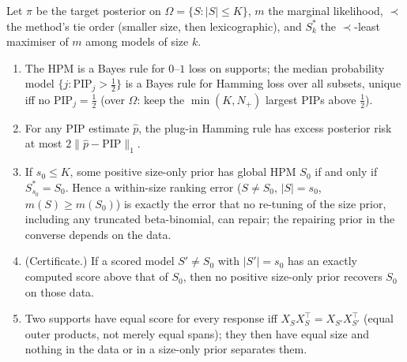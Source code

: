 \begin{proposition}\label{prop:decision}
Let $\pi$ be the target posterior on $\Omega=\{S:|S|\le K\}$, $m$ the marginal likelihood, $\prec$ the method's tie
order (smaller size, then lexicographic), and $S^*_k$ the $\prec$-least maximiser of $m$ among models of size $k$.
\begin{enumerate}
\item[(i)] The HPM is a Bayes rule for $0$--$1$ loss on supports; the median probability model
  $\{j:\mathrm{PIP}_j>\tfrac12\}$ is a Bayes rule for Hamming loss over all subsets, unique iff no
  $\mathrm{PIP}_j=\tfrac12$ (over $\Omega$: keep the $\min(K,N_+)$ largest PIPs above $\tfrac12$).
\item[(ii)] For any PIP estimate $\hat p$, the plug-in Hamming rule has excess posterior risk at most
  $2\|\hat p-\mathrm{PIP}\|_1$.
\item[(iii)] If $s_0\le K$, some positive size-only prior has global HPM $S_0$ if and only if $S^*_{s_0}=S_0$. Hence a
  within-size ranking error ($S\ne S_0$, $|S|=s_0$, $m(S)\ge m(S_0)$) is exactly the error that no re-tuning of the
  size prior, including any truncated beta-binomial, can repair; the repairing prior in the converse depends on the data.
\item[(iv)] (Certificate.) If a scored model $S'\ne S_0$ with $|S'|=s_0$ has an exactly computed score above that of
  $S_0$, then no positive size-only prior recovers $S_0$ on those data.
\item[(v)] Two supports have equal score for every response iff $X_SX_S^\top=X_{S'}X_{S'}^\top$ (equal outer
  products, not merely equal spans); they then have equal size and nothing in the data or in a size-only prior
  separates them.
\end{enumerate}
\end{proposition}

